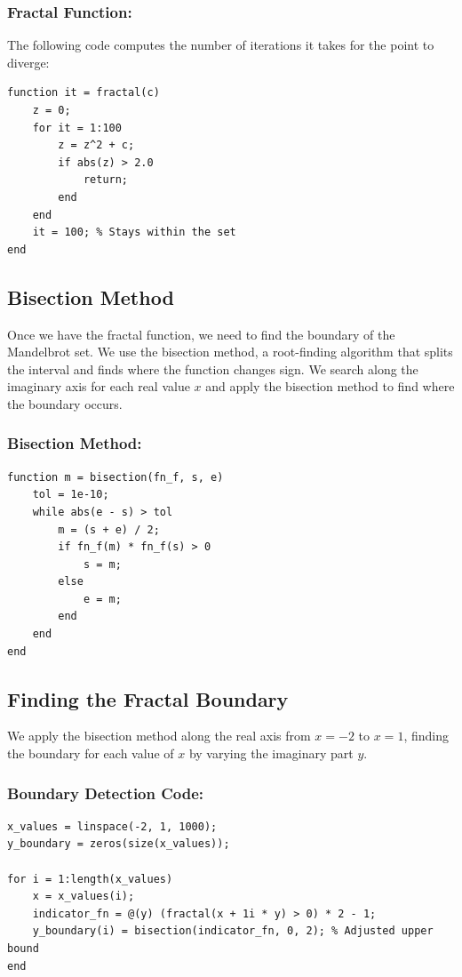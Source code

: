 \documentclass{article}
\begin{document}
\subsubsection*{Fractal Function:}
The following code computes the number of iterations it takes for the point to diverge:
\begin{verbatim}
function it = fractal(c)
    z = 0;
    for it = 1:100
        z = z^2 + c;
        if abs(z) > 2.0
            return;
        end
    end
    it = 100; % Stays within the set
end
\end{verbatim}

\subsection{Bisection Method}
Once we have the fractal function, we need to find the boundary of the Mandelbrot set. We use the bisection method, a root-finding algorithm that splits the interval and finds where the function changes sign. We search along the imaginary axis for each real value \( x \) and apply the bisection method to find where the boundary occurs.

\subsubsection*{Bisection Method:}
\begin{verbatim}
function m = bisection(fn_f, s, e)
    tol = 1e-10;
    while abs(e - s) > tol
        m = (s + e) / 2;
        if fn_f(m) * fn_f(s) > 0
            s = m;
        else
            e = m;
        end
    end
end
\end{verbatim}

\subsection{Finding the Fractal Boundary}
We apply the bisection method along the real axis from \( x = -2 \) to \( x = 1 \), finding the boundary for each value of \( x \) by varying the imaginary part \( y \).

\subsubsection*{Boundary Detection Code:}
\begin{verbatim}
x_values = linspace(-2, 1, 1000);
y_boundary = zeros(size(x_values));

for i = 1:length(x_values)
    x = x_values(i);
    indicator_fn = @(y) (fractal(x + 1i * y) > 0) * 2 - 1;
    y_boundary(i) = bisection(indicator_fn, 0, 2); % Adjusted upper bound
end
\end{verbatim}
\end{document}
